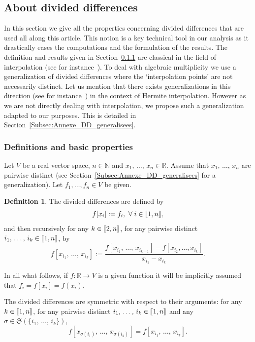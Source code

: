 \documentclass[10pt]{amsart}
\theoremstyle{definition}\newtheorem{defi}[theo]{Definition}\newtheorem{rema}[theo]{Remark}\newtheorem{exam}[theo]{Example}\newtheorem{exem}[theo]{Example}\newtheorem{nota}[theo]{Notation}
\newcommand{\llbracket}{\mathopen{[\mkern -2.7mu[}}
\newcommand{\rrbracket}{\mathclose{]\mkern -2.7mu]}}
\newcommand{\inter}[2]{\llbracket #1,#2 \rrbracket}
\newcommand{\N}{\mathbb{N}}
\newcommand{\R}{\mathbb{R}}
\let\oldforall\forall
\renewcommand*{\forall}{\mathrel{\oldforall}}
\begin{document}
\subsection{About divided differences} \label{Annexe_DD}


In this section we give all the properties concerning divided differences that are used all along this article. This notion is a key technical tool in our analysis as it drastically eases the computations and the formulation of the results. The definition and results given in Section~\ref{Subsec:Annexe_DD_classique} are classical in the field of interpolation (see for instance~\cite[Chapter 5]{Powell_1981}). To deal with algebraic multiplicity we use a generalization of divided differences where the `interpolation points' are not necessarily distinct. Let us mention that there exists generalizations in this direction (see for instance~\cite[Chapter 5]{Powell_1981}) in the context of Hermite interpolation. However as we are not directly dealing with interpolation, we propose such a generalization adapted to our purposes. This is detailed in Section~\ref{Subsec:Annexe_DD_generalisees}.

\subsubsection{Definitions and basic properties} \label{Subsec:Annexe_DD_classique}

Let $V$ be a real vector space, $n \in \N$ and $x_1,\,\dots,\,x_n \in \R$. Assume that $x_1,\,\dots,\,x_n$ are pairwise distinct (see Section~\ref{Subsec:Annexe_DD_generalisees} for a generalization). Let $f_1,\dotsc,f_n\in V$ be given.

\begin{defi} \label{Def:DifferencesDivisees}
The divided differences are defined by
\[
f[x_i]:=f_i,\ \forall i\in \inter{1}{n},
\]
and then recursively for any $k \in \inter{2}{n}$, for any pairwise distinct $i_1,\,\dots,\, i_k \in \inter{1}{n}$, by
\[
f[x_{i_1},\,\dots,\,x_{i_k}] := \frac{f[x_{i_1},\,\dots,\,x_{i_{k-1}}]-f[x_{i_2}, \dots, x_{i_k}]}{x_{i_1}-x_{i_k}}.
\]
\end{defi}
In all what follows, if $f : \R \to V$ is a given function it will be implicitly assumed that $f_i=f[x_i]=f(x_i)$.


\begin{prop}\label{Prop:DifferencesDiviseesSymetriques}
The divided differences are symmetric with respect to their arguments: for any $k \in \inter{1}{n}$, for any pairwise distinct $i_1,\,\dots,\,i_k \in \inter{1}{n}$ and any $\sigma \in \mathfrak{S}(\{i_1,\,\dotsc,\,i_k\})$,
\[
f[x_{\sigma(i_1)},\,\dots,\,x_{\sigma(i_k)}] = f[x_{i_1},\,\dots,\,x_{i_k}].
\]
\end{prop}
\end{document}
